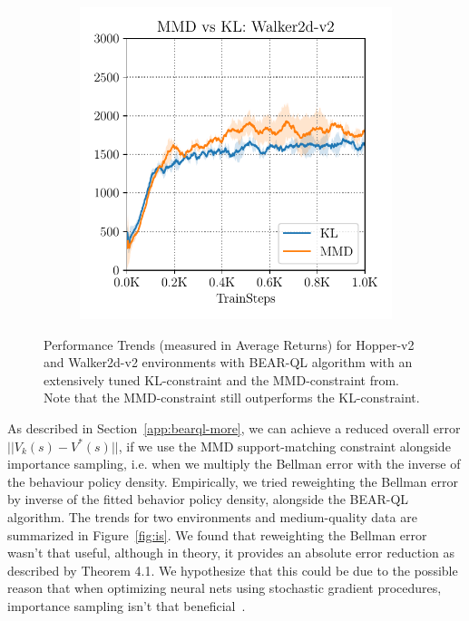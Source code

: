 \begin{figure}[t]
\begin{subfigure}[t]{0.31\textwidth}
        \includegraphics[width=0.99\linewidth]{chapters/bear/images/kl_vs_mmd_walker_again.pdf}
    \end{subfigure}%
    \caption{Performance Trends (measured in Average Returns) for Hopper-v2 and Walker2d-v2 environments with BEAR-QL algorithm with an extensively tuned KL-constraint and the MMD-constraint from. Note that the MMD-constraint still outperforms the KL-constraint.}
    \label{fig:tuned_kl}
\end{figure}

As described in Section~\ref{app:bearql-more}, we can achieve a reduced overall error $||V_k(s) - V^*(s)||$, if we use the MMD support-matching constraint alongside importance sampling, i.e. when we multiply the Bellman error with the inverse of the behaviour policy density. Empirically, we tried reweighting the Bellman error by inverse of the fitted behavior policy density, alongside the BEAR-QL algorithm. The trends for two environments and medium-quality data are summarized in Figure~\ref{fig:is}. We found that reweighting the Bellman error wasn't that useful, although in theory, it provides an absolute error reduction as described by Theorem 4.1. We hypothesize that this could be due to the possible reason that when optimizing neural nets using stochastic gradient procedures, importance sampling isn't that beneficial~\citep{byrd19is}.

